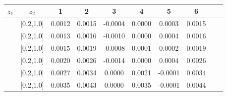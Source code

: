 \begin{table}[H]\scriptsize
\centering
\begin{tabular}{|c| c| c| c| c| c| c| c| c| c|}
\hline
$z_1$ & $z_2$ & 1 & 2 & 3 & 4& 5& 6 \\ \hline
[0.2,0.3]	&	[0.2,1.0]	&	0.0012	&	0.0015	&	-0.0004	&	0.0000	&	0.0003	&	0.0015	\\ \hline
[0.3,0.4]	&	[0.2,1.0]	&	0.0013	&	0.0016	&	-0.0010	&	0.0000	&	0.0004	&	0.0016	\\ \hline
[0.4,0.5]	&	[0.2,1.0]	&	0.0015	&	0.0019	&	-0.0008	&	0.0001	&	0.0002	&	0.0019	\\ \hline
[0.5,0.6]	&	[0.2,1.0]	&	0.0020	&	0.0026	&	-0.0014	&	0.0000	&	0.0004	&	0.0026	\\ \hline
[0.6,0.7]	&	[0.2,1.0]	&	0.0027	&	0.0034	&	0.0000	&	0.0021	&	-0.0001	&	0.0034	\\ \hline
[0.7,1.0]	&	[0.2,1.0]	&	0.0035	&	0.0043	&	0.0000	&	0.0035	&	-0.0001	&	0.0044	\\ \hline
															

\end{tabular}
\end{table}
